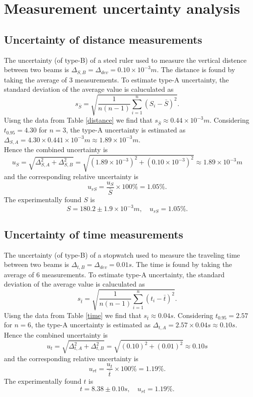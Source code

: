 \section{Measurement uncertainty analysis}
\subsection{Uncertainty of distance measurements}
    The uncertainty (of type-B) of a steel ruler used to measure the vertical distence between two beams is $\Delta_{S,B}=\Delta_{dev}=0.10\times10^{-3}m$. The distance is found by taking the average of 3 measurements. To estimate type-A uncertainty, the standard deviation of the average value is caluculated as
    \[
        s_{\bar{S}}=\sqrt{\frac{1}{n(n-1)}\sum_{i=1}^n(S_i-\bar{S})^2}.
    \]
    Uisng the data from Table \ref{distance} we find that $s_{\bar{S}}\approx 0.44\times10^{-3}m$. Considering $t_{0.95}=4.30$ for $n=3$, the type-A uncertainty is estimated as $\Delta_{S,A}=4.30\times0.441\times10^{-3}m\approx 1.89\times10^{-3}m$.\\
    Hence the combined uncertainty is
    \[
        u_{S}=\sqrt{\Delta_{S,A}^2+\Delta_{S,B}^2}=\sqrt{(1.89\times10^{-3})^2+(0.10\times10^{-3})^2}\approx 1.89\times10^{-3}m
    \]
    and the corresponding relative uncertainty is 
    \[
        u_{rS}=\frac{u_S}{\bar{S}}\times 100\%=1.05\%.
    \]
    The experimentally found $S$ is 
    \[
        S=180.2\pm 1.9 \times10^{-3}m,\quad u_{rS}=1.05\%.
    \]

\subsection{Uncertainty of time measurements}
    The uncertainty (of type-B) of a stopwatch used to measure the traveling time between two beams is $\Delta_{t,B}=\Delta_{dev}=0.01s$. The time is found by taking the average of 6 measurements. To estimate type-A uncertainty, the standard deviation of the average value is caluculated as
    \[
        s_{\bar{t}}=\sqrt{\frac{1}{n(n-1)}\sum_{i=1}^n(t_i-\bar{t})^2}.
    \]
    Uisng the data from Table \ref{time} we find that $s_{\bar{t}}\approx 0.04s$. Considering $t_{0.95}=2.57$ for $n=6$, the type-A uncertainty is estimated as $\Delta_{t,A}=2.57\times0.04s\approx 0.10s$.\\
    Hence the combined uncertainty is
    \[
        u_{t}=\sqrt{\Delta_{t,A}^2+\Delta_{t,B}^2}=\sqrt{(0.10)^2+(0.01)^2}\approx 0.10s
    \]
    and the corresponding relative uncertainty is 
    \[
        u_{rt}=\frac{u_t}{\bar{t}}\times 100\%=1.19\%.
    \]
    The experimentally found $t$ is 
    \[
        t=8.38\pm 0.10s,\quad u_{rt}=1.19\%.
    \]

